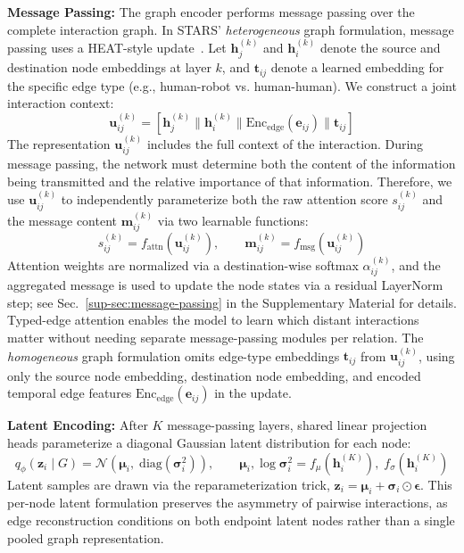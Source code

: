 \documentclass{article}
\newcommand{\method}{STARS\xspace}
\begin{document}
\textbf{Message Passing:}
The graph encoder performs message passing over the complete interaction graph.
In \method' \textit{heterogeneous} graph formulation, message passing uses a HEAT-style update~\cite{mo2021heat}.
Let $\mathbf{h}_j^{(k)}$ and $\mathbf{h}_i^{(k)}$ denote the source and destination node embeddings at layer $k$, and $\mathbf{t}_{ij}$ denote a learned embedding for the specific edge type (e.g., human-robot vs. human-human).
%
We construct a joint interaction context:
\begin{equation}
\mathbf{u}_{ij}^{(k)} = [\mathbf{h}_j^{(k)} \| \mathbf{h}_i^{(k)} \| \text{Enc}_{\text{edge}}(\mathbf{e}_{ij}) \| \mathbf{t}_{ij}]
\end{equation}
%
The representation $\mathbf{u}_{ij}^{(k)}$ includes the full context of the interaction.
During message passing, the network must determine both the content of the information being transmitted and the relative importance of that information.
Therefore, we use $\mathbf{u}_{ij}^{(k)}$ to independently parameterize both the raw attention score $s_{ij}^{(k)}$ and the message content $\mathbf{m}_{ij}^{(k)}$ via two learnable functions:
\begin{equation}
s_{ij}^{(k)} = f_{\mathrm{attn}}(\mathbf{u}_{ij}^{(k)}), \qquad \mathbf{m}_{ij}^{(k)} = f_{\mathrm{msg}}(\mathbf{u}_{ij}^{(k)})
\end{equation}
Attention weights are normalized via a destination-wise softmax $\alpha_{ij}^{(k)}$, and the aggregated message is used to update the node states via a residual LayerNorm step; see Sec.~\ref{sup-sec:message-passing} in the Supplementary Material for details.
Typed-edge attention enables the model to learn which distant interactions matter without needing separate message-passing modules per relation.
The \textit{homogeneous} graph formulation omits edge-type embeddings $\mathbf{t}_{ij}$ from $\mathbf{u}_{ij}^{(k)}$, using only the source node embedding, destination node embedding, and encoded temporal edge features $\text{Enc}_{\text{edge}}(\mathbf{e}_{ij})$ in the update.

\textbf{Latent Encoding:} After $K$ message-passing layers, shared linear projection heads parameterize a diagonal Gaussian latent distribution for each node:
\begin{equation}
q_\phi(\mathbf{z}_i \mid G) = \mathcal{N}\!\left(\boldsymbol{\mu}_i,\; \mathrm{diag}(\boldsymbol{\sigma}_i^2)\right), \qquad \boldsymbol{\mu}_i, \log \boldsymbol{\sigma}_i^2 = f_\mu(\mathbf{h}_i^{(K)}),\; f_\sigma(\mathbf{h}_i^{(K)})
\end{equation}
Latent samples are drawn via the reparameterization trick, $\mathbf{z}_i = \boldsymbol{\mu}_i + \boldsymbol{\sigma}_i \odot \boldsymbol{\epsilon}$.
This per-node latent formulation preserves the asymmetry of pairwise interactions, as edge reconstruction conditions on both endpoint latent nodes rather than a single pooled graph representation.
\end{document}
